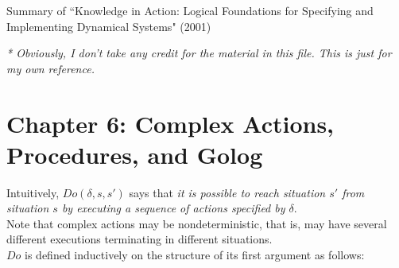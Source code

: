 \documentclass[fleqn]{report}
\begin{document}
\EnableBpAbbreviations
\def\ScoreOverhang{1pt}
\setlength{\parindent}{0pt}

\begin{flushleft}
{\Large Summary of ``Knowledge in Action: Logical Foundations for Specifying and Implementing Dynamical Systems" (2001)} \\
\end{flushleft}

\emph{* Obviously, I don't take any credit for the material in this file. This is just for my own reference.}

\section*{Chapter 6: Complex Actions, Procedures, and Golog}
Intuitively, $Do(\delta, s, s')$ says that \emph{it is possible to reach situation $s'$ from situation $s$ by executing a sequence of actions specified by $\delta$}.\\
Note that complex actions may be nondeterministic, that is, may have several different executions terminating in different situations.\\

$Do$ is defined inductively on the structure of its first argument as follows:
\end{document}
